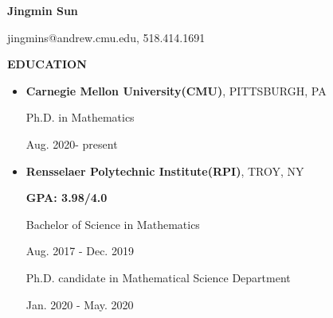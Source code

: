 \documentclass[]{article}
\newcommand{\rightAlign}{38em}
\begin{document}
	\centerline{\bf \Large Jingmin Sun}
	\centerline{jingmins@andrew.cmu.edu, 518.414.1691}
	\centerline{ }

	\textbf{EDUCATION}
	\begin{itemize}
			\item
		\begin{minipage}{\rightAlign}
				\begin{flushleft}   
			\textbf{Carnegie Mellon University(CMU)}, PITTSBURGH, PA 	\end{flushleft}   
		\end{minipage}
		\begin{minipage}{15em}
		\end{minipage}
	
\begin{minipage}{\rightAlign}
\begin{flushleft}                           
	Ph.D. in Mathematics
\end{flushleft} 
\end{minipage}
\begin{minipage}{15em}
Aug. 2020-  present
\end{minipage}
		\item
		\begin{minipage}{\rightAlign}
			\textbf{Rensselaer Polytechnic Institute(RPI)}, TROY, NY 
		\end{minipage}
		\begin{minipage}{15em}
			\textbf{GPA: 3.98/4.0}
\end{minipage}


		\begin{minipage}{\rightAlign}
			\begin{flushleft}                           
				Bachelor of Science in Mathematics
			\end{flushleft} 
		\end{minipage}
		\begin{minipage}{15em}
		Aug. 2017 -  Dec. 2019
		\end{minipage}
	
				\begin{minipage}{\rightAlign}
			\begin{flushleft}                           
				Ph.D. candidate in Mathematical Science Department
			\end{flushleft} 
		\end{minipage}
		\begin{minipage}{15em}
			Jan. 2020 -  May. 2020
		\end{minipage}
	\end{itemize}
\end{document}

